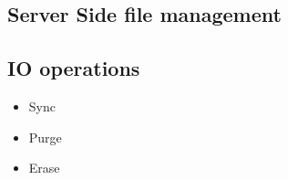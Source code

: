 \subsection{Server Side file management}
\subsection{IO operations}
\begin{itemize}
    \item Sync
    \item Purge
    \item Erase
\end{itemize}
